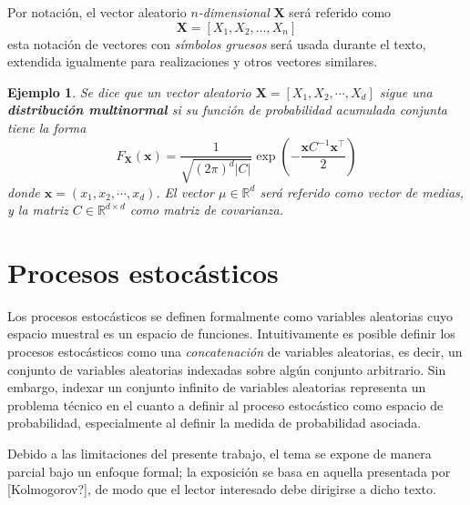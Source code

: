 \documentclass[12pt,letterpaper,draft]{book}
\newtheorem{ejemplo}{Ejemplo}[chapter]
\newcommand{\R}{\mathbb{R}}
\newcommand{\abso}[1]{\left| #1 \right|}
\begin{document}
Por notación, el vector aleatorio \textit{$n$-dimensional} $\boldsymbol{X}$ será referido como
\begin{equation}
\boldsymbol{X} = [X_1, X_2, \dots, X_n]
\end{equation}
esta notación de vectores con \textit{símbolos gruesos} será usada durante el texto, extendida igualmente para realizaciones y otros vectores similares.

\begin{ejemplo}
Se dice que un vector aleatorio $\boldsymbol{X} = [X_1, X_2, \cdots, X_d]$ sigue una \textbf{distribución multinormal} si su función de probabilidad acumulada conjunta tiene la forma
\begin{equation}
F_{\boldsymbol{X}}\left( \boldsymbol{x} \right) = \frac{1}{\sqrt{(2\pi)^{d}\abso{C}}} \exp\left( -\frac{\boldsymbol{x} C^{-1} \boldsymbol{x}^{\intercal} }{2} \right)
\end{equation}
donde $\boldsymbol{x} = (x_1, x_2, \cdots, x_d)$. El vector $\mu \in \R^{d}$ será referido como \textit{vector de medias}, y la matriz $C \in \R^{d\times d}$ como \textit{matriz de covarianza}.
\end{ejemplo}



\section{Procesos estocásticos}

Los procesos estocásticos se definen formalmente como variables aleatorias cuyo espacio muestral es un espacio de funciones.
%
Intuitivamente es posible definir %
los procesos estocásticos como una \textit{concatenación} de variables aleatorias, es decir, un conjunto de variables aleatorias indexadas sobre algún conjunto arbitrario.
%
Sin embargo, indexar un conjunto infinito de variables aleatorias representa un problema técnico en el cuanto a definir al proceso estocástico como espacio de probabilidad, especialmente al definir la medida de probabilidad asociada.

Debido a las limitaciones del presente trabajo, el tema se expone de manera parcial bajo un enfoque formal; la exposición se basa en aquella presentada por [Kolmogorov?], de modo que el lector interesado debe dirigirse a dicho texto.
\end{document}
